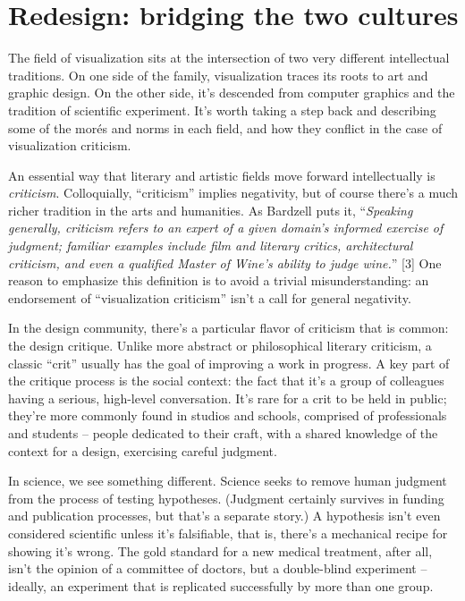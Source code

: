 \documentclass[sigconf,nonacm,screen,pbalance]{acmart}
\begin{document}
\section{Redesign: bridging the two
cultures}
The field of visualization sits at the intersection of two
very different intellectual traditions. On one side of the family, visualization traces
its roots to art and graphic design. On the other side, it's descended from computer
graphics and the tradition of scientific experiment. It's worth taking a step back and
describing some of the morés and norms in each field, and how they conflict in the case of
visualization criticism.

An essential way that literary and artistic fields move
forward intellectually is {\em criticism}. Colloquially, ``criticism'' implies
negativity, but of course there's a much richer tradition in the arts and humanities. As
Bardzell puts it, ``{\em Speaking generally, criticism refers to an expert of a
given domain's informed exercise of judgment; familiar examples include film and
literary critics, architectural criticism, and even a qualified Master of Wine's ability
to judge wine.}'' [3] One reason to emphasize this definition is to avoid a trivial
misunderstanding: an endorsement of ``visualization criticism'' isn't a call for general
negativity.

In the design community, there's a particular flavor of
criticism that is common: the design critique. Unlike more abstract or philosophical
literary criticism, a classic ``crit'' usually has the goal of improving a work in progress.
A key part of the critique process is the social context: the fact that it's a group of
colleagues having a serious, high-level conversation. It's rare for a crit to be held in
public; they're more commonly found in studios and schools, comprised of professionals and
students -- people dedicated to their craft, with a shared knowledge of the context for a
design, exercising careful judgment.

In science, we see something different. Science seeks to
remove human judgment from the process of testing hypotheses. (Judgment certainly survives
in funding and publication processes, but that's a separate story.) A hypothesis isn't
even considered scientific unless it's falsifiable, that is, there's a mechanical recipe
for showing it's wrong. The gold standard for a new medical treatment, after all, isn't
the opinion of a committee of doctors, but a double-blind experiment -- ideally, an
experiment that is replicated successfully by more than one group.
\end{document}
